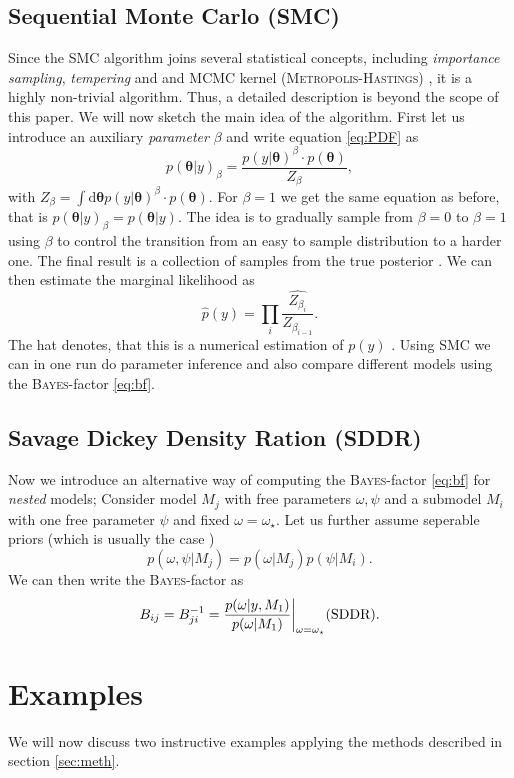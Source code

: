 \documentclass[%
 reprint,
 amsmath,amssymb,
 aps,
]{revtex4-1}
\newcommand{\btheta}{\boldsymbol{\theta}}
\begin{document}
\subsection{Sequential Monte Carlo (SMC)}\label{sec:SMC}
 \noindent
 
 Since the SMC algorithm joins several statistical concepts, including \emph{importance sampling}, \emph{tempering} and and MCMC kernel (\textsc{Metropolis-Hastings}) \cite{PyMC3_SMC}, it is a highly non-trivial algorithm. Thus, a detailed description is beyond the scope of this paper. We will now sketch the main idea of the algorithm. 
 First let us introduce an auxiliary \emph{parameter} $\beta$ and write equation \eqref{eq:PDF} as 
   $$p(\btheta|y)_\beta=\frac{p(y|\btheta)^\beta\cdot p(\btheta)}{Z_\beta},$$
   with $Z_\beta=\int\text{d}\btheta p(y|\btheta)^\beta\cdot p(\btheta)$. For $\beta=1$ we get the same equation as before, that is $p(\btheta|y)_\beta=p(\btheta|y)$. The idea is to gradually sample from $\beta=0$ to $\beta=1$ using $\beta$ to control the transition from an easy to sample distribution to a harder one. The final result is a collection of samples from the true posterior \cite{PyMC3_SMC}. We can then estimate the marginal likelihood as \cite{SMC_PEPE} $$\hat{p}(y)=\prod_{i}\widehat{\frac{Z_{\beta_i}}{Z_{\beta_{i-1}}}}.$$
   The hat denotes, that this is a numerical estimation of $p(y)$ \cite{PyMC3_SMC}. Using SMC we can in one run do parameter inference and also compare different models using the \textsc{Bayes}-factor \eqref{eq:bf}.
 
\subsection{Savage Dickey Density Ration (SDDR)}
Now we introduce an alternative way of computing the \textsc{Bayes}-factor \eqref{eq:bf} for \emph{nested} models; Consider model $M_j$ with free parameters $\omega,\psi$ and a submodel $M_i$ with one free parameter $\psi$ and fixed $\omega=\omega_\star$. Let us further assume seperable priors (which is usually the case \cite{trotta}) $$p(\omega,\psi|M_j)=p(\omega|M_j)p(\psi|M_i).$$
We can then write the \textsc{Bayes}-factor as \cite{trotta} \begin{equation}
	\label{eq:sddr}
	B_{ij}=B_{ji}^{-1}=\frac{p(\omega|y,M_1)}{p(\omega|M_1)}\bigg|_{\omega=\omega_\star}  \text{\hfill (SDDR)}.
\end{equation}

\section{Examples}
We will now discuss two instructive examples applying the methods described in section \eqref{sec:meth}.
\end{document}
